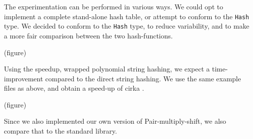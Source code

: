 \documentclass[]{article}
\newcommand{\funk}[1]{\small\texttt{#1}}
\begin{document}
The experimentation can be performed in various ways. We could opt to implement a complete stand-alone hash table, or attempt to conform to the \funk{Hash} type. We decided to conform to the \funk{Hash} type, to reduce variability, and to make a more fair comparison between the two hash-functions.



(figure)

Using the speedup, wrapped polynomial string hashing, we expect a time-improvement compared to the direct string hashing. We use the same example files as above, and obtain a speed-up of cirka . %

(figure)

Since we also implemented our own version of Pair-multiply-shift, we also compare that to the standard library. 
\end{document}
